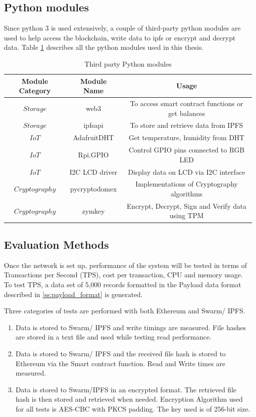\documentclass[11pt,openright]{report}
\begin{document}
\subsection{Python modules}
Since python 3 is used extensively, a couple of third-party python modules are used to help access the blockchain, write data to ipfs or encrypt and decrypt data. Table \ref{python_modules} describes all the python modules used in this thesis.
\begin{table}[!htbp]
    \renewcommand{\arraystretch}{1.3}
    \caption{Third party Python modules}
    \label{python_modules}
    \centering
    \begin{tabular}{|c|c|c|}
        \hline
        \bfseries Module Category & \bfseries Module Name & \bfseries Usage \\
        \hline\hline
        $Storage$ & web3 & To access smart contract functions or get balances \\ \hline
        $Storage$ & ipfsapi & To store and retrieve data from IPFS \\ \hline
        $IoT$ & AdafruitDHT & Get temperature, humidity from DHT \\ \hline
        $IoT$ & Rpi.GPIO & Control GPIO pins connected to RGB LED \\ \hline
        $IoT$ & I2C LCD driver & Display data on LCD via I2C interface \\ \hline
        $Cryptography$ & pycryptodomex & Implementations of Cryptography algorithms \\ \hline
        $Cryptography$ & zymkey & Encrypt, Decrypt, Sign and Verify data using TPM \\ \hline
    \end{tabular}
\end{table}

\subsection{Evaluation Methods}
Once the network is set up, performance of the system will be tested in terms of Transactions per Second (TPS), cost per transaction, CPU and memory usage. To test TPS, a data set of 5,000 records formatted in the Payload data format described in \ref{ss:payload_format} is generated.

Three categories of tests are performed with both Ethereum and Swarm/ IPFS.
\begin{enumerate}
    \item Data is stored to Swarm/ IPFS and write timings are measured. File hashes are stored in a text file and used while testing read performance.
    \item Data is stored to Swarm/ IPFS and the received file hash is stored to Ethereum via the Smart contract function. Read and Write times are measured.
    \item Data is stored to Swarm/IPFS in an encrypted format. The retrieved file hash is then stored and retrieved when needed. Encryption Algorithm used for all tests is AES-CBC with PKCS padding. The key used is of 256-bit size.
\end{enumerate}
\end{document}
